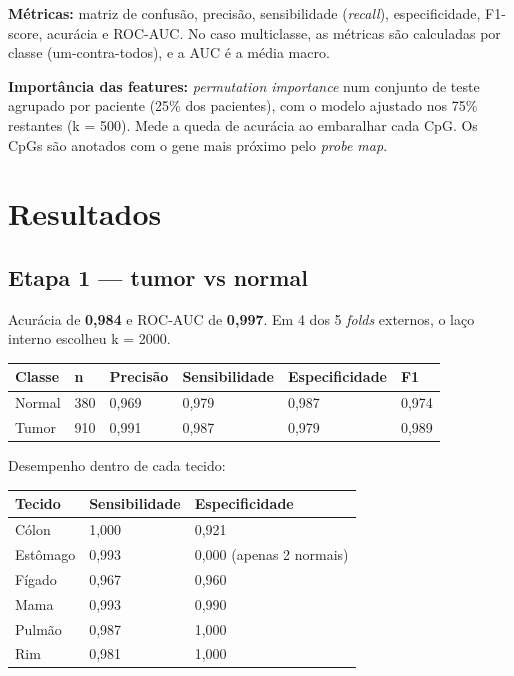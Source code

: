 \documentclass[11pt,a4paper]{article}
\begin{document}
\textbf{Métricas:} matriz de confusão, precisão, sensibilidade (\emph{recall}),
especificidade, F1-score, acurácia e ROC-AUC. No caso multiclasse, as métricas
são calculadas por classe (um-contra-todos), e a AUC é a média macro.

\textbf{Importância das features:} \emph{permutation importance} num conjunto de
teste agrupado por paciente (25\% dos pacientes), com o modelo ajustado nos 75\%
restantes (k = 500). Mede a queda de acurácia ao embaralhar cada CpG. Os CpGs
são anotados com o gene mais próximo pelo \emph{probe map}.

\section{Resultados}

\subsection{Etapa 1 --- tumor vs normal}

Acurácia de \textbf{0,984} e ROC-AUC de \textbf{0,997}. Em 4 dos 5 \emph{folds}
externos, o laço interno escolheu k = 2000.

{\def\LTcaptype{none} %
\begin{longtable}[]{@{}llllll@{}}
\toprule\noalign{}
Classe & n & Precisão & Sensibilidade & Especificidade & F1 \\
\midrule\noalign{}
\endhead
\bottomrule\noalign{}
\endlastfoot
Normal & 380 & 0,969 & 0,979 & 0,987 & 0,974 \\
Tumor & 910 & 0,991 & 0,987 & 0,979 & 0,989 \\
\end{longtable}
}

Desempenho dentro de cada tecido:

{\def\LTcaptype{none} %
\begin{longtable}[]{@{}lll@{}}
\toprule\noalign{}
Tecido & Sensibilidade & Especificidade \\
\midrule\noalign{}
\endhead
\bottomrule\noalign{}
\endlastfoot
Cólon & 1,000 & 0,921 \\
Estômago & 0,993 & 0,000 (apenas 2 normais) \\
Fígado & 0,967 & 0,960 \\
Mama & 0,993 & 0,990 \\
Pulmão & 0,987 & 1,000 \\
Rim & 0,981 & 1,000 \\
\end{longtable}
}
\end{document}
